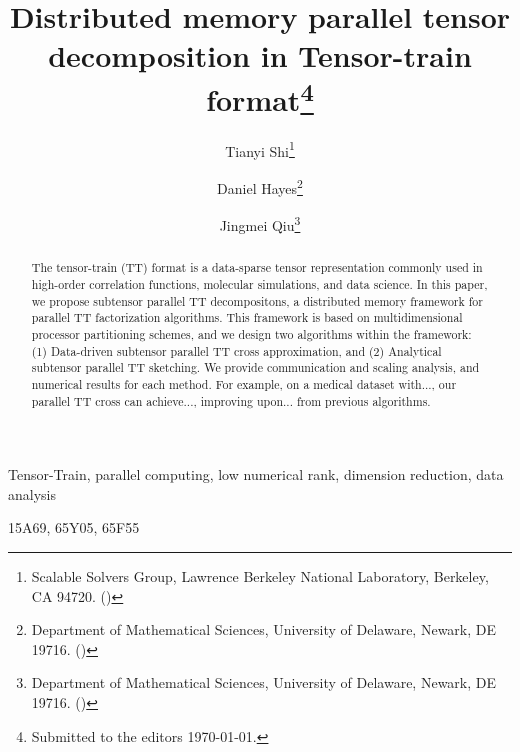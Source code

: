 \documentclass[11pt,a4paper,review]{siamart220329}
\title{Distributed memory parallel tensor decomposition in Tensor-train format\thanks{Submitted to the editors \today.}}
\author{Tianyi Shi\thanks{Scalable Solvers Group, Lawrence Berkeley National Laboratory, Berkeley, CA 94720. (\email{tianyishi@lbl.gov})}
\and Daniel Hayes\thanks{Department of Mathematical Sciences, University of Delaware, Newark, DE 19716. (\email{dphayes@udel.edu})}
\and Jingmei Qiu\thanks{Department of Mathematical Sciences, University of Delaware, Newark, DE 19716. (\email{jingqiu@udel.edu})}}
\begin{document}
\newcommand{\R}[0]{\mathbb{R}}
\newcommand{\C}[0]{\mathbb{C}}
\maketitle

\begin{abstract}
The tensor-train (TT) format is a data-sparse tensor representation commonly used in high-order correlation functions, molecular simulations, and data science. In this paper, we propose subtensor parallel TT decompositons, a distributed memory framework for parallel TT factorization algorithms. This framework is based on multidimensional processor partitioning schemes, and we design two algorithms within the framework: (1) Data-driven subtensor parallel TT cross approximation, and (2) Analytical subtensor parallel TT sketching. We provide communication and scaling analysis, and numerical results for each method. For example, on a medical dataset with..., our parallel TT cross can achieve..., improving upon... from previous algorithms.
\end{abstract}

\begin{keywords}
Tensor-Train, parallel computing, low numerical rank, dimension reduction, data analysis
\end{keywords}

\begin{AMS}
15A69, 65Y05, 65F55
\end{AMS}
\end{document}
